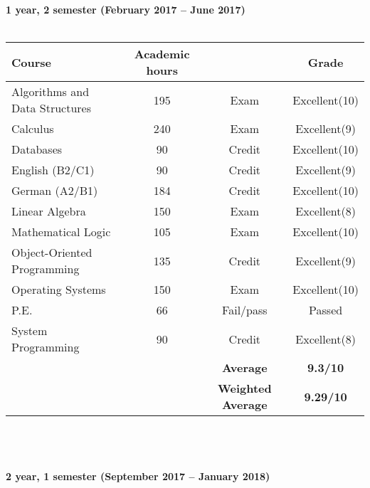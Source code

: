 \documentclass[11pt, a4paper]{report}
\newcommand{\upperRomannumeral}[1]{\uppercase\expandafter{\romannumeral#1}}
\begin{document}
\\ \\
\newpage
\textbf{1 year, 2 semester (February 2017 -- June 2017)}\\ \\
\begin{tabular}{|p{6cm}|c|c|c|}
\hline
\rowcolor{LightCyan}
\textbf{Course}&\textbf{Academic hours}& &\textbf{Grade}\\
\hline
Algorithms and Data Structures \upperRomannumeral{2} & 195 & Exam & Excellent(10)\\
Calculus \upperRomannumeral{2} & 240 & Exam & Excellent(9)\\
Databases & 90 & Credit & Excellent(10)\\
English (B2/C1) & 90 & Credit & Excellent(9)\\
German (A2/B1) & 184 & Credit & Excellent(10)\\
Linear Algebra \upperRomannumeral{2} & 150 & Exam & Excellent(8)\\
Mathematical Logic \upperRomannumeral{2} & 105 & Exam & Excellent(10)\\
Object-Oriented Programming & 135 & Credit & Excellent(9)\\
Operating Systems & 150 & Exam & Excellent(10)\\
P.E. & 66 & Fail/pass & Passed \\System Programming  & 90 & Credit & Excellent(8)\\
\hline
\rowcolor{LightCyan}
&& \textbf{Average} & \textbf{9.3/10}\\
\rowcolor{LightCyan}
\hline
&& \textbf{Weighted Average} & \textbf{9.29/10}\\
\hline
\end{tabular}
\\
\\ \\
\textbf{2 year, 1 semester (September 2017 -- January 2018)}\\ \\
\end{document}
